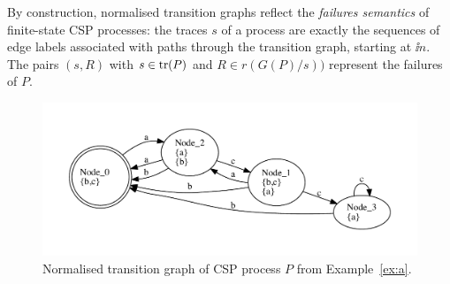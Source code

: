 %

By construction, normalised transition graphs reflect the \emph{failures semantics} of finite-state CSP processes:
the traces $s$ of a process are exactly the sequences of edge labels associated
with paths through the transition graph,
starting at $\ii n$. The pairs $(s,R)$ with $s\in\text{tr}(P)$ and
$R\in r(G(P)/s))$ represent the failures of $P$.


 \begin{figure}
 \begin{center}
\includegraphics[width=\textwidth]{q0.pdf}
\end{center}
\caption{Normalised transition graph of CSP process $P$ from Example~\ref{ex:a}.}
 \label{fig:tga}
 \end{figure}



